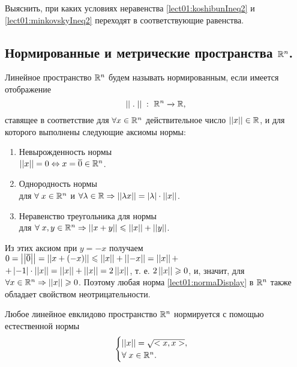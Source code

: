 \begin{exercise}
Выяснить, при каких условиях неравенства \eqref{lect01:koshibunIneq2} и \eqref{lect01:minkovskyIneq2} переходят в соответствующие равенства.	
\end{exercise}

\subsection{Нормированные и метрические пространства $ \mathbb{R}^n $.}

Линейное пространство $ \mathbb{R}^n $ будем называть нормированным, если имеется отображение
\begin{equation}
	\label{lect01:normaDisplay}
	\norma{\; . \;} \; \colon \; \RN \xrightarrow{} \mathbb{R},
\end{equation}
ставящее в соответствие для $ \forall x \in \mathbb{R}^n $ действительное число $ \left\lvert\left\lvert x\right\rvert\right\rvert \in \mathbb{R} $, и для которого выполнены следующие аксиомы нормы:
\begin{enumerate}
    \item {Невырожденность нормы}\\    
    $ \left\lvert\left\lvert x\right\rvert\right\rvert = 0 \Leftrightarrow x = \overline{0} \in \mathbb{R}^n $.
    \item {Однородность нормы}\\
    для $ \forall \; x \in \mathbb{R}^n $ и $ \forall \lambda \in \mathbb{R} \Rightarrow \left\lvert\left\lvert\lambda x\right\rvert\right\rvert = \left\lvert \lambda \right\rvert \cdot \left\lvert\left\lvert x\right\rvert\right\rvert$.
    \item {Неравенство треугольника для нормы}\\
    для $ \forall \; x, y \in \mathbb{R}^n \Rightarrow \left\lvert\left\lvert x+y\right\rvert\right\rvert \leqslant \left\lvert\left\lvert x\right\rvert\right\rvert + \left\lvert\left\lvert y\right\rvert\right\rvert $.
\end{enumerate}

Из этих аксиом при $ y = - x $ получаем
$ 0 = \left\lvert\left\lvert\overline{0}\right\rvert\right\rvert = \left\lvert\left\lvert x + (-x)\right\rvert\right\rvert \leqslant \left\lvert\left\lvert x\right\rvert\right\rvert + \left\lvert\left\lvert-x\right\rvert\right\rvert = \left\lvert\left\lvert x\right\rvert\right\rvert + $ 
$ + \left\lvert -1 \right\rvert \cdot \left\lvert\left\lvert x\right\rvert\right\rvert = \left\lvert\left\lvert x\right\rvert\right\rvert + \left\lvert\left\lvert x\right\rvert\right\rvert = 2 \left\lvert\left\lvert x\right\rvert\right\rvert$, 
т. е. $ 2 \left\lvert\left\lvert x\right\rvert\right\rvert \geqslant 0 $, и, значит, для $ \forall x \in \mathbb{R}^n \Rightarrow \left\lvert\left\lvert x\right\rvert\right\rvert \geqslant 0$. Поэтому любая норма \eqref{lect01:normaDisplay} в $ \mathbb{R}^n $ также обладает свойством неотрицательности.

\begin{theorem}
    Любое линейное евклидово пространство $ \mathbb{R}^n $ нормируется с помощью естественной нормы
    \begin{equation}
        \label{lect01:naturalNorma}
        \begin{cases}	
        	\norma{x} = \sqrt{ < x, x > }, \\
            \forall \; x \in \RN.
        \end{cases}
    \end{equation}    
\end{theorem}

